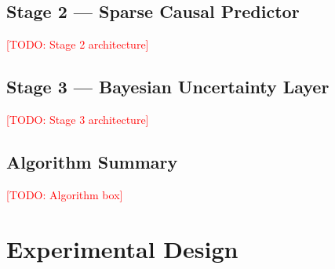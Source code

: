 \documentclass[11pt]{article}
\newcommand{\todo}[1]{\textcolor{red}{[TODO: #1]}}
\begin{document}
\subsection{Stage 2 — Sparse Causal Predictor}
%
%
\todo{Stage 2 architecture}

\subsection{Stage 3 — Bayesian Uncertainty Layer}
%
\todo{Stage 3 architecture}

\subsection{Algorithm Summary}
\todo{Algorithm box}

\section{Experimental Design}
\end{document}

